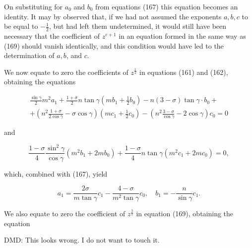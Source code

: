On substituting for \(a_0\) and \(b_0\) from equations (167) this
equation becomes an identity. It may by observed that, if we had not
assumed the exponents \(a, b, c\) to be equal to \(-\frac{1}{2}\), but
had left them undetermined, it would still have been necessary that the
coefficient of \(z^{e+1}\) in an equation formed in the same way as
(169) should vanish identically, and this condition would have led to
the determination of \(a, b\), and \(c\).

We now equate to zero the coefficients of \(z^{\frac{1}{2}}\) in
equations (161) and (162), obtaining the equations

\[\begin{array}{c}
\frac{\sin \gamma}{2} m^2 a_1+\frac{1+\sigma}{2} n \tan \gamma\left(m b_1+\frac{1}{2} b_0\right)-n(3-\sigma) \tan \gamma \cdot b_0+\\
+\left(n^2 \frac{1+\sigma}{2 \cos \gamma}-\sigma \cos \gamma\right)\left(m c_1+\frac{1}{2} c_0\right)
-\left(n^2 \frac{3-\sigma}{\cos \gamma}-2 \cos \gamma\right) c_0=0
\end{array}\]

and

\[\frac{1-\sigma}{4} \frac{\sin ^2 \gamma}{\cos \gamma}\left(m^2 b_1+2 m b_0\right)+\frac{1-\sigma}{4} n \tan \gamma\left(m^2 c_1+2 m c_0\right)=0,\]

which, combined with (167), yield

\[a_1=\frac{2 \sigma}{m \tan \gamma} c_1-\frac{4-\sigma}{m^2 \tan \gamma} c_0, \quad b_1=-\frac{n}{\sin \gamma} c_1 .\]

We also equate to zero the coefficient of \(z^{\frac{3}{2}}\) in
equation (169), obtaining the equation

DMD: This looks wrong.  I do not want to touch it.

